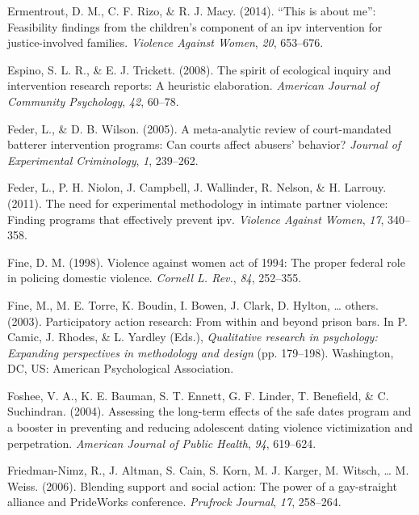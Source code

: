 \documentclass[11pt,]{tufte-book}
\begin{document}
\hypertarget{ref-ermentrout2014this}{}
Ermentrout, D. M., C. F. Rizo, \& R. J. Macy. (2014). ``This is about
me'': Feasibility findings from the children's component of an ipv
intervention for justice-involved families. \emph{Violence Against
Women}, \emph{20}, 653--676.

\hypertarget{ref-espino2008spirit}{}
Espino, S. L. R., \& E. J. Trickett. (2008). The spirit of ecological
inquiry and intervention research reports: A heuristic elaboration.
\emph{American Journal of Community Psychology}, \emph{42}, 60--78.

\hypertarget{ref-feder2005meta}{}
Feder, L., \& D. B. Wilson. (2005). A meta-analytic review of
court-mandated batterer intervention programs: Can courts affect
abusers' behavior? \emph{Journal of Experimental Criminology}, \emph{1},
239--262.

\hypertarget{ref-feder2011need}{}
Feder, L., P. H. Niolon, J. Campbell, J. Wallinder, R. Nelson, \& H.
Larrouy. (2011). The need for experimental methodology in intimate
partner violence: Finding programs that effectively prevent ipv.
\emph{Violence Against Women}, \emph{17}, 340--358.

\hypertarget{ref-fine1998violence}{}
Fine, D. M. (1998). Violence against women act of 1994: The proper
federal role in policing domestic violence. \emph{Cornell L. Rev.},
\emph{84}, 252--355.

\hypertarget{ref-fine2003participatory}{}
Fine, M., M. E. Torre, K. Boudin, I. Bowen, J. Clark, D. Hylton,
\ldots{} others. (2003). Participatory action research: From within and
beyond prison bars. In P. Camic, J. Rhodes, \& L. Yardley (Eds.),
\emph{Qualitative research in psychology: Expanding perspectives in
methodology and design} (pp. 179--198). Washington, DC, US: American
Psychological Association.

\hypertarget{ref-foshee2004assessing}{}
Foshee, V. A., K. E. Bauman, S. T. Ennett, G. F. Linder, T. Benefield,
\& C. Suchindran. (2004). Assessing the long-term effects of the safe
dates program and a booster in preventing and reducing adolescent dating
violence victimization and perpetration. \emph{American Journal of
Public Health}, \emph{94}, 619--624.

\hypertarget{ref-friedman-nimz2006blending}{}
Friedman-Nimz, R., J. Altman, S. Cain, S. Korn, M. J. Karger, M. Witsch,
\ldots{} M. Weiss. (2006). Blending support and social action: The power
of a gay-straight alliance and PrideWorks conference. \emph{Prufrock
Journal}, \emph{17}, 258--264.
\end{document}
